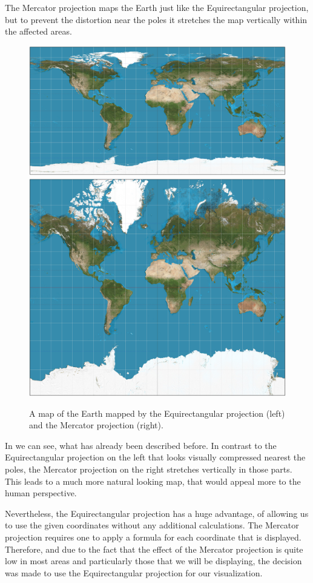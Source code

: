 \documentclass
[
    paper = a4,
    pagesize,
    12 pt,
    oneside,                       %
    open = right,
    DIV = calc,
    BCOR = 0 mm,                   %
    bibtotoc
]
{scrbook}
\begin{document}
The Mercator projection maps the Earth just like the Equirectangular projection, but to prevent the distortion near the poles it stretches the map vertically within the affected areas.

\begin{figure}
  \begin{minipage}{\textwidth}
    \includegraphics[width=.5\textwidth]{Images/Equirectangular_projection_SW.jpg}
    \includegraphics[width=.5\textwidth]{Images/Mercator_projection_SW.jpg}
    \caption[]{A map of the Earth mapped by the Equirectangular projection (left) and the Mercator projection (right). }
    \label{fig:projections}
  \end{minipage}
\end{figure}

In  we can see, what has already been described before.
In contrast to the Equirectangular projection on the left that looks visually compressed nearest the poles, the Mercator projection on the right stretches vertically in those parts.
This leads to a much more natural looking map, that would appeal more to the human perspective.

Nevertheless, the Equirectangular projection has a huge advantage, of allowing us to use the given coordinates without any additional calculations.
The Mercator projection requires one to apply a formula for each coordinate that is displayed.
Therefore, and due to the fact that the effect of the Mercator projection is quite low in most areas and particularly those that we will be displaying, the decision was made to use the Equirectangular projection for our visualization.
\end{document}
